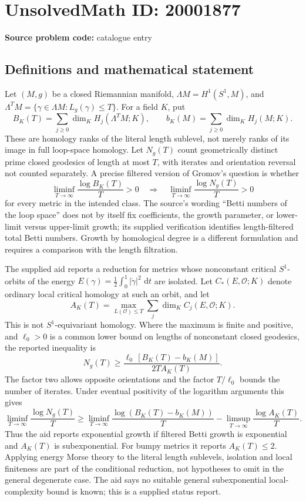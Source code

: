 \documentclass[11pt]{article}
\newcommand{\dd}{\,\mathrm{d}}
\begin{document}
\section*{UnsolvedMath ID: 20001877}
\textbf{Source problem code:} catalogue entry
\subsection{Definitions and mathematical statement}
Let \((M,g)\) be a closed Riemannian manifold, \(\Lambda M=H^1(S^1,M)\), and \(\Lambda^T M=\{\gamma\in\Lambda M:L_g(\gamma)\leq T\}\). For a field \(K\), put
\[
B_K(T)=\sum_{j\geq0}\dim_KH_j(\Lambda^T M;K),\qquad
b_K(M)=\sum_{j\geq0}\dim_KH_j(M;K).
\]
These are homology ranks of the literal length sublevel, not merely ranks of its image in full loop-space homology. Let \(N_g(T)\) count geometrically distinct prime closed geodesics of length at most \(T\), with iterates and orientation reversal not counted separately. A precise filtered version of Gromov's question is whether
\[
\liminf_{T\to\infty}\frac{\log B_K(T)}T>0
\quad\Longrightarrow\quad
\liminf_{T\to\infty}\frac{\log N_g(T)}T>0
\]
for every metric in the intended class. The source's wording ``Betti numbers of the loop space'' does not by itself fix coefficients, the growth parameter, or lower-limit versus upper-limit growth; its supplied verification identifies length-filtered total Betti numbers. Growth by homological degree is a different formulation and requires a comparison with the length filtration.

The supplied aid reports a reduction for metrics whose nonconstant critical \(S^1\)-orbits of the energy \(E(\gamma)=\tfrac12\int_0^1|\dot\gamma|^2\,\dd t\) are isolated. Let \(C_*(E,\mathcal O;K)\) denote ordinary local critical homology at such an orbit, and let
\[
A_K(T)=\max_{L(\mathcal O)\leq T}\sum_j\dim_K C_j(E,\mathcal O;K).
\]
This is not \(S^1\)-equivariant homology. Where the maximum is finite and positive, and \(\ell_0>0\) is a common lower bound on lengths of nonconstant closed geodesics, the reported inequality is
\[
N_g(T)\geq\frac{\ell_0\,[B_K(T)-b_K(M)]}{2T A_K(T)}.
\]
The factor two allows opposite orientations and the factor \(T/\ell_0\) bounds the number of iterates. Under eventual positivity of the logarithm arguments this gives
\[
\liminf_{T\to\infty}\frac{\log N_g(T)}T
\geq
\liminf_{T\to\infty}\frac{\log(B_K(T)-b_K(M))}T
-\limsup_{T\to\infty}\frac{\log A_K(T)}T.
\]
Thus the aid reports exponential growth if filtered Betti growth is exponential and \(A_K(T)\) is subexponential. For bumpy metrics it reports \(A_K(T)\leq2\). Applying energy Morse theory to the literal length sublevels, isolation and local finiteness are part of the conditional reduction, not hypotheses to omit in the general degenerate case. The aid says no suitable general subexponential local-complexity bound is known; this is a supplied status report.
\end{document}
